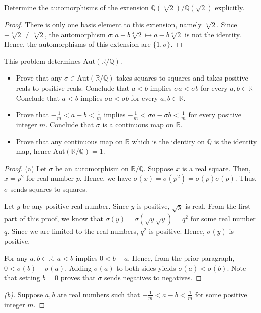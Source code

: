 \documentclass[10pt]{article}
\newcommand{\Q}{\mathbb{Q}}
\newcommand{\R}{\mathbb{R}}
\newenvironment{problem}[2][Problem]{\begin{trivlist}
		\item[\hskip \labelsep {\bfseries #1}\hskip \labelsep {\bfseries #2.}]}{\end{trivlist}}
\begin{document}
	\begin{problem}{1.5}
		Determine the automorphisms of the extension $\Q(\sqrt[4]{2})/\Q(\sqrt{2})$ explicitly.
		\begin{proof}
			There is only one basis element to this extension, namely $\sqrt[4]{2}$. Since $-\sqrt[4]{2} \not = \sqrt[4]{2}$, the automorphism $\sigma : a + b\sqrt[4]{2} \mapsto a - b\sqrt[4]{2}$ is not the identity. Hence, the automorphisms of this extension are $\{1, \sigma\}$.
		\end{proof}
	\end{problem}
	
	\begin{problem}{1.7}
		This problem determines $\text{Aut}(\R/\Q)$.
		\begin{itemize}
			\item[\textbf{(a)}]
				Prove that any $\sigma \in \text{Aut}(\R/\Q)$ takes squares to squares and takes positive reals to positive reals. Conclude that $a < b$ implies $\sigma a < \sigma b$ for every $a, b \in \R$ Conclude that $a<b$ implies $\sigma a<\sigma b$ for every $a,b \in \R$.
			\item[\textbf{(b)}]
				Prove that $-\frac{1}{m} < a - b < \frac{1}{m}$ implies $-\frac{1}{m} < \sigma a - \sigma b < \frac{1}{m}$ for every positive integer $m$. Conclude that $\sigma$ is a continuous map on $\R$.
			\item[\textbf{(c)}]
				Prove that any continuous map on $\R$ which is the identity on $\Q$ is the identity map, hence $\text{Aut}(\R/\Q)=1$. 
		\end{itemize}
		\begin{proof}{(a)}
			Let $\sigma$ be an automorphism on $\R/\Q$. Suppose $x$ is a real square. Then, $x = p^2$ for real number $p$. Hence, we have $\sigma(x) = \sigma(p^2) = \sigma(p)\sigma(p)$. Thus, $\sigma$ sends squares to squares. 
			
			Let $y$ be any positive real number. Since $y$ is positive, $\sqrt{y}$ is real. From the first part of this proof, we know that $\sigma(y) = \sigma(\sqrt{y}\sqrt{y}) = q^2$ for some real number $q$. Since we are limited to the real numbers, $q^2$ is positive. Hence, $\sigma(y)$ is positive.
			
			For any $a,b \in \R$, $a<b$ implies $0 < b-a$. Hence, from the prior paragraph, $0 < \sigma(b) - \sigma(a)$. Adding $\sigma(a)$ to both sides yields $\sigma(a) < \sigma(b)$. Note that setting $b=0$ proves that $\sigma$ sends negatives to negatives.
		\end{proof}
		\begin{proof}[(b)]
			Suppose $a,b$ are real numbers such that $-\frac{1}{m} < a - b < \frac{1}{m}$ for some positive integer $m$.
			

\end{proof}
\end{problem}
\end{document}
